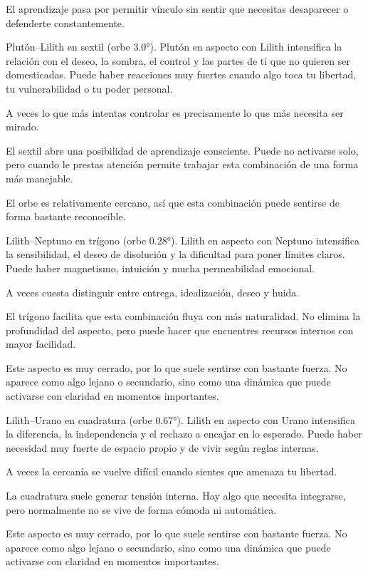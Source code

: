 \documentclass[11pt,a4paper]{article}
\begin{document}
El aprendizaje pasa por permitir vínculo sin sentir que necesitas desaparecer o defenderte constantemente.

Plutón–Lilith en sextil (orbe 3.0°).
Plutón en aspecto con Lilith intensifica la relación con el deseo, la sombra, el control y las partes de ti que no quieren ser domesticadas. Puede haber reacciones muy fuertes cuando algo toca tu libertad, tu vulnerabilidad o tu poder personal.

A veces lo que más intentas controlar es precisamente lo que más necesita ser mirado.

El sextil abre una posibilidad de aprendizaje consciente. Puede no activarse solo, pero cuando le prestas atención permite trabajar esta combinación de una forma más manejable.

El orbe es relativamente cercano, así que esta combinación puede sentirse de forma bastante reconocible.

Lilith–Neptuno en trígono (orbe 0.28°).
Lilith en aspecto con Neptuno intensifica la sensibilidad, el deseo de disolución y la dificultad para poner límites claros. Puede haber magnetismo, intuición y mucha permeabilidad emocional.

A veces cuesta distinguir entre entrega, idealización, deseo y huida.

El trígono facilita que esta combinación fluya con más naturalidad. No elimina la profundidad del aspecto, pero puede hacer que encuentres recursos internos con mayor facilidad.

Este aspecto es muy cerrado, por lo que suele sentirse con bastante fuerza. No aparece como algo lejano o secundario, sino como una dinámica que puede activarse con claridad en momentos importantes.

Lilith–Urano en cuadratura (orbe 0.67°).
Lilith en aspecto con Urano intensifica la diferencia, la independencia y el rechazo a encajar en lo esperado. Puede haber necesidad muy fuerte de espacio propio y de vivir según reglas internas.

A veces la cercanía se vuelve difícil cuando sientes que amenaza tu libertad.

La cuadratura suele generar tensión interna. Hay algo que necesita integrarse, pero normalmente no se vive de forma cómoda ni automática.

Este aspecto es muy cerrado, por lo que suele sentirse con bastante fuerza. No aparece como algo lejano o secundario, sino como una dinámica que puede activarse con claridad en momentos importantes.
\end{document}

